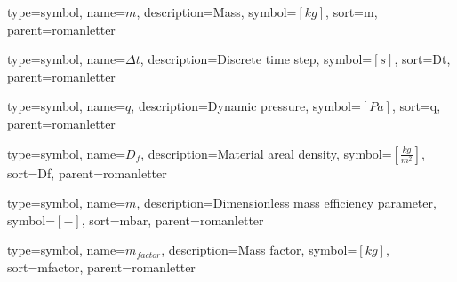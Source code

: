 {
type=symbol, %
name={\ensuremath{m}}, %
description={Mass}, %
symbol={$\left[kg\right]$}, %
sort=m, %
parent=romanletter %
}

{
type=symbol, %
name={\ensuremath{\Delta t}}, %
description={Discrete time step}, %
symbol={$\left[s\right]$}, %
sort=Dt, %
parent=romanletter %
}

{
type=symbol, %
name={\ensuremath{q}}, %
description={Dynamic pressure}, %
symbol={$\left[Pa\right]$}, %
sort=q, %
parent=romanletter %
}

{
type=symbol, %
name={\ensuremath{D_f}}, %
description={Material areal density}, %
symbol={$\left[\frac{kg}{m^2}\right]$}, %
sort=Df, %
parent=romanletter %
}

{
type=symbol, %
name={\ensuremath{\bar{m}}}, %
description={Dimensionless mass efficiency parameter}, %
symbol={$\left[-\right]$}, %
sort=mbar, %
parent=romanletter %
}

{
type=symbol, %
name={\ensuremath{m_{factor}}}, %
description={Mass factor}, %
symbol={$\left[kg \right]$}, %
sort=mfactor, %
parent=romanletter %
}


